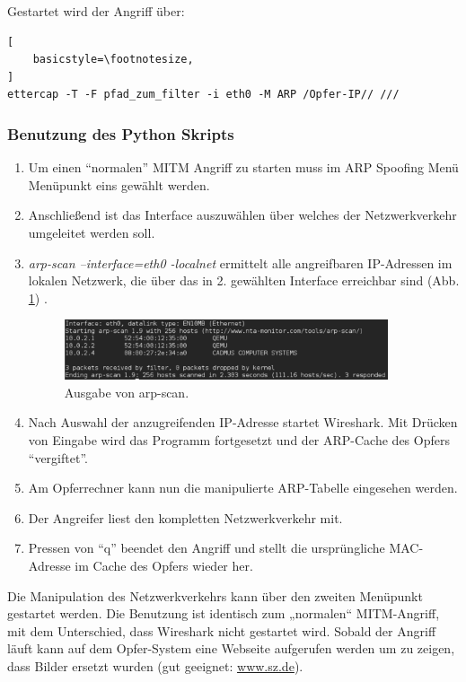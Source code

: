 Gestartet wird der Angriff über:
\lstset{language=bash}
\begin{lstlisting}[
	basicstyle=\footnotesize,
]
ettercap -T -F pfad_zum_filter -i eth0 -M ARP /Opfer-IP// ///
\end{lstlisting}

\subsubsection{Benutzung des Python Skripts}
\begin{enumerate}
	\item Um einen "`normalen"' MITM Angriff zu starten muss im ARP Spoofing Menü Menüpunkt eins gewählt werden. 
	\item Anschließend ist das Interface auszuwählen über welches der Netzwerkverkehr umgeleitet werden soll.
	\item \textit{arp-scan --interface=eth0 -localnet} ermittelt alle angreifbaren IP-Adressen im lokalen Netzwerk, die über das in 2. gewählten Interface erreichbar sind (Abb. \ref{fig:arp_scan}) .
	\begin{figure}[h!]
	\centering
		\includegraphics[width=0.90\textwidth]{bilder/arpSpoofing/arp_scan.pdf}
	\caption{Ausgabe von arp-scan.}
	\label{fig:arp_scan}
\end{figure}
	\item Nach Auswahl der anzugreifenden IP-Adresse startet Wireshark. Mit Drücken von Eingabe wird das Programm fortgesetzt und der ARP-Cache des Opfers "`vergiftet"'.
	\item Am Opferrechner kann nun die manipulierte ARP-Tabelle eingesehen werden.
	\item Der Angreifer liest den kompletten Netzwerkverkehr mit.
	\item Pressen von "`q"' beendet den Angriff und stellt die ursprüngliche MAC-Adresse im Cache des Opfers wieder her. 
\end{enumerate}

Die Manipulation des Netzwerkverkehrs kann über den zweiten Menüpunkt gestartet werden. Die Benutzung ist identisch zum „normalen“ MITM-Angriff, mit dem Unterschied, dass Wireshark nicht gestartet wird. Sobald der Angriff läuft kann auf dem Opfer-System eine Webseite aufgerufen werden um zu zeigen, dass Bilder ersetzt wurden (gut geeignet: \url{www.sz.de}).

